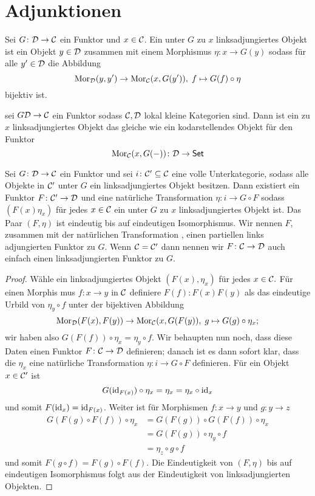 \section{Adjunktionen}
\begin{Def}
    Sei \(G\colon\mathcal{D}\to\mathcal{C}\) ein Funktor und \(x\in\mathcal{C}\). Ein unter \(G\) zu \(x\) linksadjungiertes Objekt ist ein Objekt \(y\in\mathcal{D}\) zusammen mit einem Morphismus \(\eta\colon x\to G(y)\) sodass für alle \(y'\in\mathcal{D}\) die Abbildung 
    \[\operatorname{Mor}_{\mathcal{D}}(y,y')\to\operatorname{Mor}_{\mathcal{C}}(x,G(y')), \; f\mapsto G(f)\circ\eta\] bijektiv ist.
\end{Def}
\begin{Bem}
    sei \(G\mathcal{D}\to\mathcal{C}\) ein Funktor sodass \(\mathcal{C},\mathcal{D}\) lokal kleine Kategorien sind. Dann ist ein zu \(x\) linksadjungiertes Objekt das gleiche wie ein kodarstellendes Objekt für den Funktor \[\operatorname{Mor}_{\mathcal{C}}(x,G(-))\colon \mathcal{D}\to\mathsf{Set}\]
\end{Bem}
\begin{Satz}\label{Satz:AdjFun}
    Sei \(G\colon\mathcal{D}\to\mathcal{C}\) ein Funktor und sei \(i\colon \mathcal{C}'\subseteq \mathcal{C}\) eine volle Unterkategorie, sodass alle Objekte in \(\mathcal{C}'\) unter \(G\) ein linksadjungiertes Objekt besitzen. Dann existiert ein Funktor \(F\colon \mathcal{C}'\to\mathcal{D}\) und eine natürliche Transformation \(\eta\colon i\to G\circ F\) sodass \((F(x) \eta_x)\) für jedes \(x\in\mathcal{C}\) ein unter \(G\) zu \(x\) linksadjungiertes Objekt ist. Das Paar
 \((F,\eta )\) ist eindeutig bis auf eindeutigen Isomorphismus.
 Wir nennen \(F\), zusammen mit der natürlichen Transformation , einen partiellen links
adjungierten Funktor zu \(G\). Wenn \(\mathcal{C}= \mathcal{C}'\) dann nennen wir \(F\colon \mathcal{C}\to \mathcal{D}\) auch einfach einen
 linksadjungierten Funktor zu \(G\).
\end{Satz}
\begin{proof}
    Wähle ein linksadjungiertes Objekt \((F(x), \eta_x)\) für jedes \(x\in\mathcal{C}.\) Für einen Morphis
mus \(f\colon x\to y\) in \(\mathcal{C}\) definiere \(F(f)\colon F(x) F(y)\) als das eindeutige Urbild von \(\eta_y\circ f\) unter
 der bijektiven Abbildung
 \[\operatorname{Mor}_{\mathcal{D}} (F(x),F(y))\to \operatorname{Mor}_{\mathcal{C}} (x,G(F(y)),\; g\mapsto G(g)\circ \eta_x;\]
 wir haben also \(G(F(f))\circ\eta_x = \eta_y\circ f.\)
 Wir behaupten nun noch, dass diese Daten einen Funktor $F\colon \mathcal{C}
 \to \mathcal{D}$ definieren; danach
 ist es dann sofort klar, dass die \(\eta_x\) eine natürliche Transformation \(\eta\colon i\to G\circ F\) definieren.
 Für ein Objekt \(x\in\mathcal{C}'\) ist
\[ G(\mathrm{id}_{F(x)})\circ\eta_x = \eta_x= \eta_x \circ\mathrm{id}_x\]
 und somit \(F(\mathrm{id}_x) = \mathrm{id}_{F(x)}\). Weiter ist für Morphismen \(f\colon x\to y\) und \(g\colon  y\to  z\)
\begin{align*}
    G(F(g)\circ F(f))\circ \eta_x&=G(F(g))\circ G(F(f))\circ\eta_x\\
 &=G(F(g))\circ\eta_y\circ f\\
 &= \eta_z\circ g\circ f
\end{align*} 
 und somit \(F(g\circ f) = F(g)\circ F(f).\)
 Die Eindeutigkeit von \((F,\eta)\) bis auf eindeutigen Isomorphismus folgt aus der Eindeutigkeit
 von linksadjungierten Objekten.
\end{proof}
